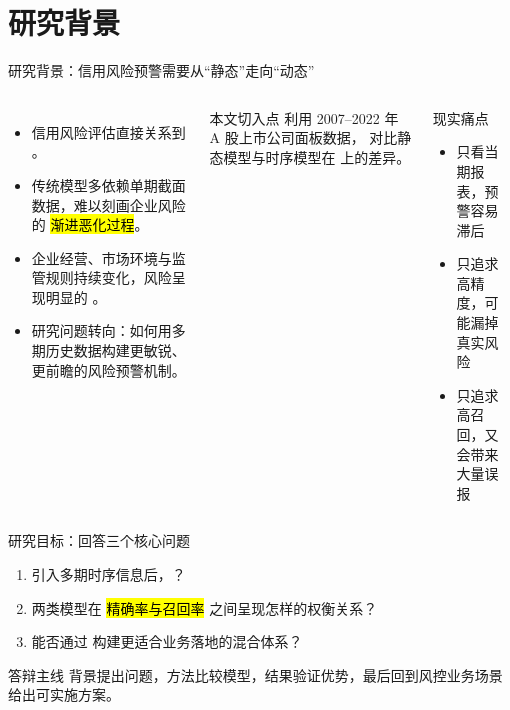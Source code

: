 \section{研究背景}

\begin{frame}{研究背景：信用风险预警需要从“静态”走向“动态”}
  \begin{columns}[T,onlytextwidth]
    \begin{itemize}
      \item 信用风险评估直接关系到 。
      \item 传统模型多依赖单期截面数据，难以刻画企业风险的 \hl{渐进恶化过程}。
      \item 企业经营、市场环境与监管规则持续变化，风险呈现明显的 。
      \item 研究问题转向：如何用多期历史数据构建更敏锐、更前瞻的风险预警机制。
    \end{itemize}

    \begin{block}{本文切入点}
      利用 2007--2022 年 A 股上市公司面板数据，
      对比静态模型与时序模型在  上的差异。
    \end{block}

    \begin{exampleblock}{现实痛点}
      \begin{itemize}
        \item 只看当期报表，预警容易滞后
        \item 只追求高精度，可能漏掉真实风险
        \item 只追求高召回，又会带来大量误报
      \end{itemize}
    \end{exampleblock}
  \end{columns}
\end{frame}

\begin{frame}{研究目标：回答三个核心问题}
  \begin{enumerate}
    \item 引入多期时序信息后，？
    \item 两类模型在 \hl{精确率与召回率} 之间呈现怎样的权衡关系？
    \item 能否通过  构建更适合业务落地的混合体系？
  \end{enumerate}

  \vspace{0.6em}
  \begin{alertblock}{答辩主线}
    背景提出问题，方法比较模型，结果验证优势，最后回到风控业务场景给出可实施方案。
  \end{alertblock}
\end{frame}
